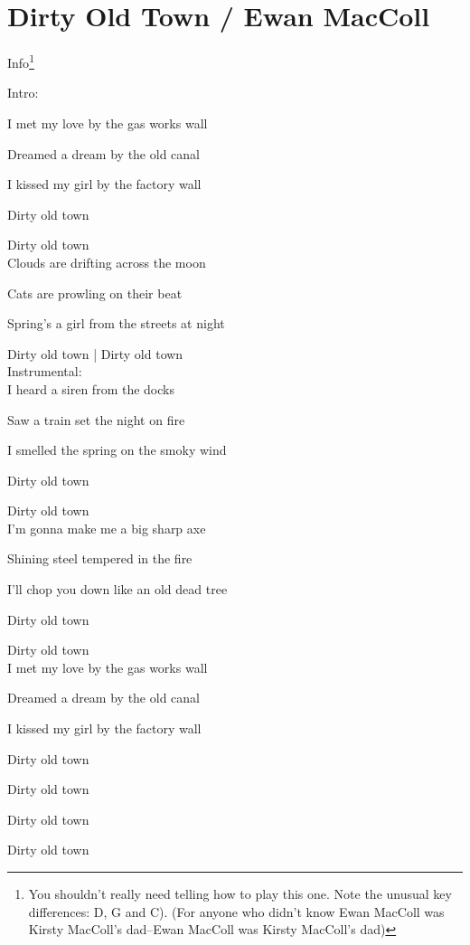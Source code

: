 \section{Dirty Old Town / Ewan MacColl}\label{sec:dirty_old_town}
Info\footnote{You shouldn’t really need telling how to play this one. Note the unusual key differences: D, G and C). (For anyone who didn’t know Ewan MacColl was Kirsty MacColl's dad--Ewan MacColl was Kirsty MacColl's dad)}
\Cmajor
\Dmajor
\Fmajor
\Gmajor
\Aminor
\Bminor
\EminorSeven

Intro:\hrulefill{}\hrulefill{}\hrulefill{}\hrulefill

I met my love by the gas works wall 

Dreamed a dream by the old canal

I kissed my girl by the factory wall

Dirty old town

Dirty old town\\


Clouds are drifting across the moon 

Cats are prowling on their beat 

Spring's a girl from the streets at night 

Dirty old town | Dirty old town\\


Instrumental: \hrulefill{}\hrulefill{}\hrulefill{}\hrulefill{}\hrulefill\\


I heard a siren from the docks

Saw a train set the night on fire 

I smelled the spring on the smoky wind 

Dirty old town

Dirty old town\\


I'm gonna make me a big sharp axe 

Shining steel tempered in the fire 

I'll chop you down like an old dead tree 

Dirty old town

Dirty old town\\


I met my love by the gas works wall 

Dreamed a dream by the old canal

I kissed my girl by the factory wall

Dirty old town

Dirty old town

Dirty old town

Dirty old town